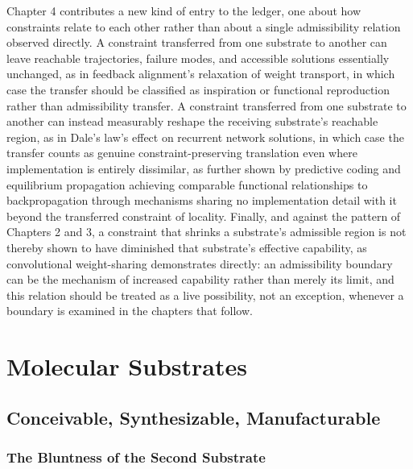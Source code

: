 \documentclass[11pt]{book}
\begin{document}
Chapter 4 contributes a new kind of entry to the ledger, one about how constraints relate to each other rather than about a single admissibility relation observed directly. A constraint transferred from one substrate to another can leave reachable trajectories, failure modes, and accessible solutions essentially unchanged, as in feedback alignment's relaxation of weight transport, in which case the transfer should be classified as inspiration or functional reproduction rather than admissibility transfer. A constraint transferred from one substrate to another can instead measurably reshape the receiving substrate's reachable region, as in Dale's law's effect on recurrent network solutions, in which case the transfer counts as genuine constraint-preserving translation even where implementation is entirely dissimilar, as further shown by predictive coding and equilibrium propagation achieving comparable functional relationships to backpropagation through mechanisms sharing no implementation detail with it beyond the transferred constraint of locality. Finally, and against the pattern of Chapters 2 and 3, a constraint that shrinks a substrate's admissible region is not thereby shown to have diminished that substrate's effective capability, as convolutional weight-sharing demonstrates directly: an admissibility boundary can be the mechanism of increased capability rather than merely its limit, and this relation should be treated as a live possibility, not an exception, whenever a boundary is examined in the chapters that follow.


\part{Molecular Substrates}


\chapter{Conceivable, Synthesizable, Manufacturable}

\section{The Bluntness of the Second Substrate}
\end{document}
